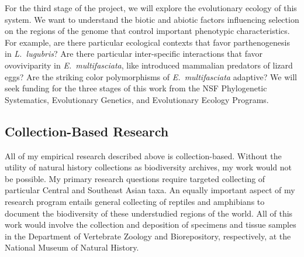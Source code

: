 For the third stage of the project, we will explore the evolutionary ecology of
this system.
We want to understand the biotic and abiotic factors influencing selection on
the regions of the genome that control important phenotypic characteristics.
For example, are there particular ecological contexts that favor
parthenogenesis in \emph{L.\ lugubris}?
Are there particular inter-specific interactions that favor ovoviviparity in
\emph{E.\ multifasciata}, like introduced mammalian predators of lizard eggs?
Are the striking color polymorphisms of \emph{E.\ multifasciata} adaptive?
We will seek funding for the three stages of this work from the NSF
Phylogenetic Systematics, Evolutionary Genetics, and Evolutionary Ecology
Programs.


\subsection*{Collection-Based Research}
All of my empirical research described above is collection-based.
Without the utility of natural history collections as biodiversity archives,
my work would not be possible.
My primary research questions require targeted collecting of particular
Central and Southeast Asian taxa.
An equally important aspect of my research program entails general 
collecting of reptiles and amphibians to document the biodiversity of
these understudied regions of the world.
All of this work would involve the collection and deposition of specimens and
tissue samples in the Department of Vertebrate Zoology and Biorepository,
respectively, at the National Museum of Natural History.

